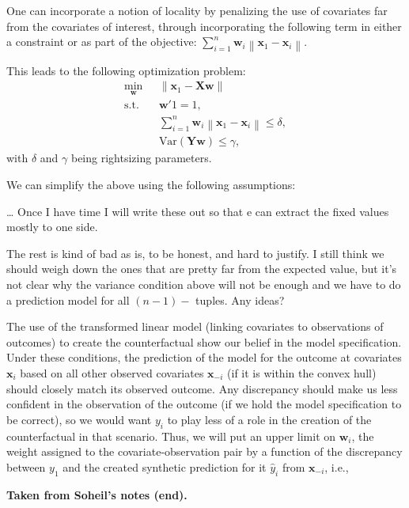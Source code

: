 \documentclass[11pt]{article}
\newcommand{\w}{\textbf{w}}
\newcommand{\x}{\textbf{x}}
\newcommand{\X}{\textbf{X}}
\newcommand{\Y}{\textbf{Y}}
\newcommand{\norm}[1]{\left\lVert#1\right\rVert}
\newcommand\red[1]{{\color{red}#1}}
\begin{document}
One can incorporate a notion of locality by penalizing the use of covariates 
far from the covariates of interest, through incorporating the following term 
in either a constraint or as part of the objective:
$\sum_{i=1}^n \w_i \norm{\x_1 - \x_i}$.

This leads to the following optimization problem:
\begin{align*}
\min_{\w} ~~~& \norm{\x_1 - \X\w}\\
\text{s.t.}~~~& \w'1=1,\\
& \sum_{i=1}^n \w_i\norm{\x_1 - \x_i} \leq \delta, \\
& \text{Var}(\Y\w)\leq \gamma,
\end{align*}
with $\delta$ and $\gamma$ being rightsizing parameters. 

We can simplify the above using the following assumptions:

\ldots
\red{Once I have time I will write these out so that e can extract the fixed values mostly to one side.}


\red{The rest is kind of bad as is, to be honest, and hard to justify. I still think we should weigh down the ones that are pretty far from the expected value, but it's not clear why the variance condition above will not be enough and we have to do a prediction model for all $(n-1)-$ tuples. Any ideas?}

The use of the transformed linear model (linking covariates to observations of 
outcomes) to create the counterfactual show our belief in the model 
specification. Under these conditions, the prediction of the model for the 
outcome at covariates $\x_i$ based on all other observed covariates $\x_{-i}$ 
(if it is within the convex hull) should closely match its observed outcome.  
Any discrepancy should make us less confident in the observation of the 
outcome (if we hold the model specification to be correct), so we would want 
$y_i$ to play less of a role in the creation of the counterfactual in that 
scenario.  Thus, we will put an upper limit on $\w_i$, the weight assigned to 
the covariate-observation pair by a function of the discrepancy between $y_1$ 
and the created synthetic prediction for it $\hat{y}_i$ from $\x_{-i}$, i.e., 





 
{\bf Taken from Soheil's notes (end).} \\

\end{document}
